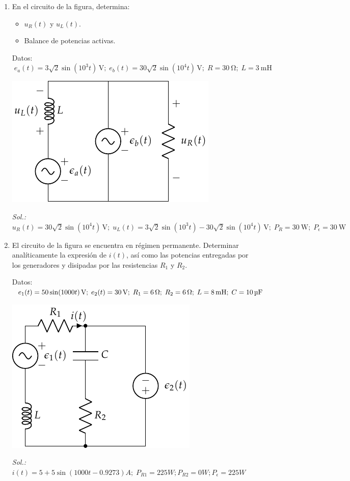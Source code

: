 \begin{enumerate}
\item En el circuito de la figura, determina:
  \begin{itemize}
  \item $u_R(t)$ y $u_L(t)$.
  \item Balance de potencias activas.
  \end{itemize}
  Datos:
  $\; e_a(t) = {3\sqrt{2} \sin(10^3 t)} \,\si{\volt};\;e_b(t) = {30\sqrt{2}
    \sin(10^4 t)}\,\si{\volt};\;R = \qty{30}{\ohm};\;L = \qty{3}{\milli\henry}$
  \begin{center}
    \includegraphics{../figs/superposicion2_ej.pdf}
  \end{center}

  \emph{Sol.:\;
    $u_R(t) = 30\sqrt{2}\sin(10^4 t)\,\si{\volt};\; u_L(t) = 3\sqrt{2}\sin(10^3
    t) - 30\sqrt{2}\sin(10^4 t)\,\si{\volt};\; P_R = \qty{30}{\watt};\; P_\epsilon =
    \qty{30}{\watt}$}

\item El circuito de la figura se encuentra en régimen
  permanente. Determinar analíticamente la expresión de $i(t)$, así
  como las potencias entregadas por los generadores y disipadas por
  las resistencias $R_1$ y $R_2$.

  Datos:
  $\; e_1(t) = \qty[parse-numbers=false]{50 \sin(1000 t)}{\volt};\;
  e_2(t) = \qty{30}{\volt};\;
  R_1 = \qty{6}{\ohm};\;
  R_2 = \qty{6}{\ohm};\;
  L = \qty{8}{\milli\henry};\;
  C = \qty{10}{\micro\farad}$

  \begin{center}
    \includegraphics{../figs/superposicion1_ej.pdf}
  \end{center}
  \emph{Sol.:\;
    $i(t) = 5 + 5\sin(1000t - 0.9273){A};\; P_{R1} = {225}{W}; P_{R2}
    = {0}{W}; P_{\epsilon} = {225}{W}$}



\end{enumerate}
